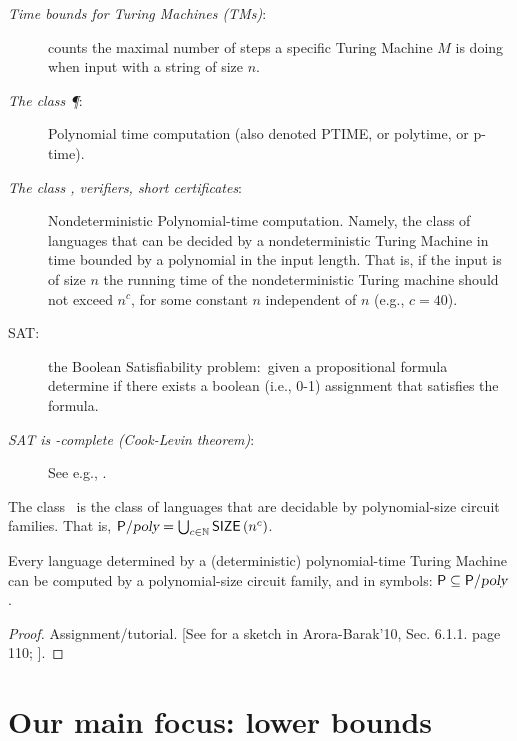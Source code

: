 \begin{description}
\item[\textit{Time bounds for Turing Machines (TMs)}:] counts the maximal number of steps a specific Turing Machine $M$ is doing when input with a string of  size $n$. 

\item[\textit{The class \P}:]  Polynomial time computation (also denoted  PTIME, or polytime, or p-time).

\item[\textit{The class \NP, verifiers, short certificates}:] Nondeterministic Polynomial-time computation. Namely, the class of languages that can be decided by a nondeterministic Turing Machine in time bounded by a polynomial in the input length.  That is, if the input is of size $n$ the running time of the nondeterministic Turing machine should not exceed $n^c$, for some constant $n$ independent of $n$ (e.g.,  $c=40$). 

\item[SAT:] the Boolean Satisfiability problem:\ given a propositional formula determine if there exists a boolean (i.e., 0-1) assignment that satisfies the formula. 

\item[\textit{SAT is \NP-complete (Cook-Levin theorem)}:] See e.g., \cite{AB09,Pap94}.
\end{description}






\begin{definition} The class \Ppoly~is the class of languages that are decidable by polynomial-size circuit families.
That is, ${\mathsf{P}}/{\textsl{poly}}=\bigcup_{c \in \mathbb{N}} \operatorname{{\mathsf{SIZE}}}\left(n^c\right)$.
\end{definition}


\begin{theorem} Every language determined by a (deterministic) polynomial-time Turing Machine can be computed by a polynomial-size circuit  family, and in symbols: 
${\mathsf{P}} \subseteq {\ensuremath{\mathsf{P}}}/{\textsl{poly}}$.
\end{theorem}

\begin{proof}
Assignment/tutorial.
[See for a sketch in Arora-Barak'10, Sec. 6.1.1. page 110; \cite{AB09}]. \end{proof}

\section{Our main focus: lower bounds}


